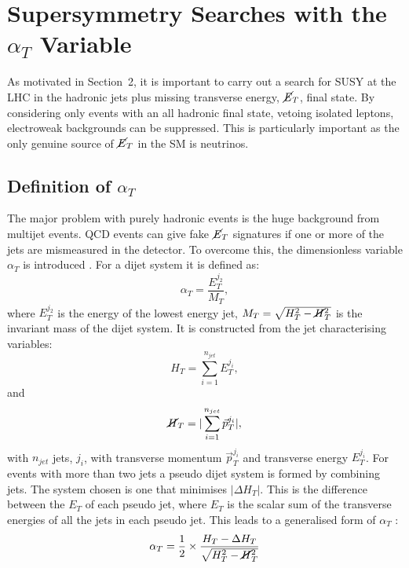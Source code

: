 
\section{Supersymmetry Searches with the \boldmath $\alpha_T$ Variable}
\label{sec:alphaT}

As motivated in Section~2, it is important to carry out a search for SUSY at the LHC in the hadronic jets plus missing transverse energy, $\cancel{E}_T$, final state. By considering only events with an all hadronic final state, vetoing isolated leptons, electroweak backgrounds can be suppressed. This is particularly important as the only genuine source of $\cancel{E}_T$ in the SM is neutrinos.
\subsection{Definition of \boldmath $\alpha_T$}
The major problem with purely hadronic events is the huge background from multijet events. QCD events can give fake $\cancel{E}_T$ signatures if one or more of the jets are mismeasured in the detector. To overcome this, the dimensionless variable $\alpha_T$ is introduced \cite{AlphaTproposalCMS:2008vya} \cite{AlphaTproposalPhysRevLett.101.221803}. For a dijet system it is defined as:
\begin{equation}
\alpha_T=\frac{E_T^{j_2}}{M_T},
\end{equation}
where $E_T^{j_2}$ is the energy of the lowest energy jet, $M_T=\sqrt{H_T^2-\cancel{H}_T^2}$ is the invariant mass of the dijet system. It is constructed from the jet characterising variables:
\begin{equation}
H_T=\sum_{i=1}^{n_{jet}}E_T^{j_i}, 
\end{equation}
and
\begin{equation}
\cancel{H}_T=|\sum_{i=1}^{n_{jet}}\vec{p}_T^{j_i}|,
\end{equation}
with $n_{jet}$ jets, $j_i$, with transverse momentum $\vec{p}_T^{j_i}$ and transverse energy $E_T^{j_i}$. For events with more than two jets a pseudo dijet system is formed by combining jets. The system chosen is one that minimises $|\Delta H_T|$. This is the difference between the $E_T$ of each pseudo jet, where $E_T$ is the scalar sum of the transverse energies of all the jets in each pseudo jet. This leads to a generalised form of $\alpha_T$ \cite{AlphaT8TeVChatrchyan:2013lya}:
\begin{equation}
\alpha_T=\frac{1}{2}\times\frac{H_T-\Delta H_T}{\sqrt{H_T^2-\cancel{H}_T^2}}
\end{equation}
